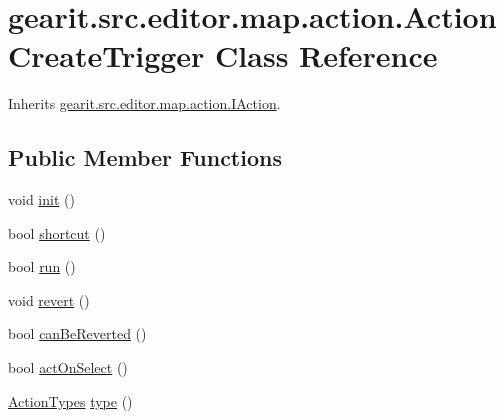 \hypertarget{classgearit_1_1src_1_1editor_1_1map_1_1action_1_1_action_create_trigger}{\section{gearit.\+src.\+editor.\+map.\+action.\+Action\+Create\+Trigger Class Reference}
\label{classgearit_1_1src_1_1editor_1_1map_1_1action_1_1_action_create_trigger}
}


Inherits \hyperlink{interfacegearit_1_1src_1_1editor_1_1map_1_1action_1_1_i_action}{gearit.\+src.\+editor.\+map.\+action.\+I\+Action}.

\subsection*{Public Member Functions}
\begin{DoxyCompactItemize}
\item 
void \hyperlink{classgearit_1_1src_1_1editor_1_1map_1_1action_1_1_action_create_trigger_a27da3bf28bb3f85512f9f65c6f1786bf}{init} ()
\item 
bool \hyperlink{classgearit_1_1src_1_1editor_1_1map_1_1action_1_1_action_create_trigger_a186625672c5fb3e96de43c6a39c3b1db}{shortcut} ()
\item 
bool \hyperlink{classgearit_1_1src_1_1editor_1_1map_1_1action_1_1_action_create_trigger_a30a82f31b37608017e097d65a969838c}{run} ()
\item 
void \hyperlink{classgearit_1_1src_1_1editor_1_1map_1_1action_1_1_action_create_trigger_a5e668be8cc5666f9b166a379a589fcb0}{revert} ()
\item 
bool \hyperlink{classgearit_1_1src_1_1editor_1_1map_1_1action_1_1_action_create_trigger_a1675be6aa3ef614598312eff39afc0f8}{can\+Be\+Reverted} ()
\item 
bool \hyperlink{classgearit_1_1src_1_1editor_1_1map_1_1action_1_1_action_create_trigger_af5ff61e4d3712af6aaa07f5581608879}{act\+On\+Select} ()
\item 
\hyperlink{namespacegearit_1_1src_1_1editor_1_1map_1_1action_af036712a7d960b13d1e31954e65c00e3}{Action\+Types} \hyperlink{classgearit_1_1src_1_1editor_1_1map_1_1action_1_1_action_create_trigger_a131346b1eeef84337e02679fc4f8ce63}{type} ()
\end{DoxyCompactItemize}


